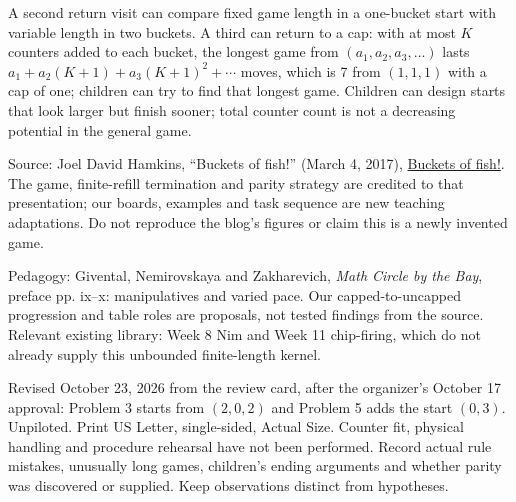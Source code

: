 \documentclass[11pt,letterpaper]{article}
\begin{document}
A second return visit can compare fixed game length in a one-bucket start with variable length in two buckets. A third can return to a cap: with at most $K$ counters added to each bucket, the longest game from $(a_1,a_2,a_3,\ldots)$ lasts $a_1+a_2(K+1)+a_3(K+1)^2+\cdots$ moves, which is 7 from $(1,1,1)$ with a cap of one; children can try to find that longest game. Children can design starts that look larger but finish sooner; total counter count is not a decreasing potential in the general game.

Source: Joel David Hamkins, ``Buckets of fish!'' (March 4, 2017), \href{https://jdh.hamkins.org/buckets-of-fish/}{Buckets of fish!}. The game, finite-refill termination and parity strategy are credited to that presentation; our boards, examples and task sequence are new teaching adaptations. Do not reproduce the blog's figures or claim this is a newly invented game.

Pedagogy: Givental, Nemirovskaya and Zakharevich, \emph{Math Circle by the Bay}, preface pp. ix--x: manipulatives and varied pace. Our capped-to-uncapped progression and table roles are proposals, not tested findings from the source. Relevant existing library: Week 8 Nim and Week 11 chip-firing, which do not already supply this unbounded finite-length kernel.

Revised October 23, 2026 from the review card, after the organizer's October 17 approval: Problem 3 starts from $(2,0,2)$ and Problem 5 adds the start $(0,3)$. Unpiloted. Print US Letter, single-sided, Actual Size. Counter fit, physical handling and procedure rehearsal have not been performed. Record actual rule mistakes, unusually long games, children's ending arguments and whether parity was discovered or supplied. Keep observations distinct from hypotheses.
\end{document}
